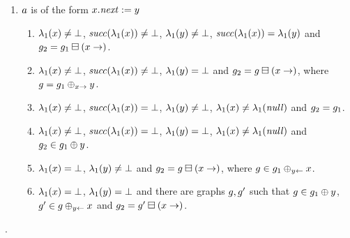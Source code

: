 {\begin{enumerate}
\begin{enumerate}
\begin{enumerate}
    $\labeling_1(\xvar)=\undef$, %
    $\labeling_1(\yvar)=\undef$ %
    there are graphs $\graph,\graph',\graph_3$ such that
    $\graph\equals\graph_1\addVar{\xvar}$, %
    $\graph'\in\graph\addVarAsPredOf{\xvar}{\yvar}$, %
    $\graph_3\equals\graph'\addEdgeBetween{\yvar}{\xvar}$ and %
    $\graph_2=\graph_3\delVar{\xvar}$.
    Observe that \xvar\ just serves here as a temporary variable.
  \end{enumerate}
\item $a$ is of the form $x.{\it next}:=y$
  \begin{enumerate}
  \item \label{pre:case:dotNextAssignedA}%
    $\lambda_1(x)\neq\bot$, %
    ${\it succ}(\lambda_1(x))\neq\bot$, %
    $\lambda_1(y)\neq\bot$, %
    ${\it succ}(\lambda_1(x))=\lambda_1(y)$ and
    $g_2=g_1\boxminus({x}\rightarrow)$.
  \item \label{pre:case:dotNextAssignedB}%
    $\lambda_1(x)\neq\bot$, %
    ${\it succ}(\lambda_1(x))\neq\bot$, %
    $\labeling_1(\yvar)=\undef$ and %
    $g_2=g\boxminus({x}\rightarrow)$, %
    where $g=g_1\oplus_{{x}\rightarrow}{y}$.
  \item \label{pre:case:dotNextAssignedC}%
    $\lambda_1(x)\neq\bot$, %
    ${\it succ}(\lambda_1(x))=\bot$, %
    $\lambda_1(y)\neq\bot$, %
    $\lambda_1(x)\neq\lambda_1({\it null})$ %
    and %
    $g_2=g_1$.
  \item \label{pre:case:dotNextAssignedD}%
    $\lambda_1(x)\neq\bot$, %
    ${\it succ}(\lambda_1(x))=\bot$, %
    $\labeling_1(\yvar)=\undef$, %
    $\lambda_1(x)\neq\lambda_1({\it null})$ and %
    $g_2\in g_1\oplus{\ensuremath{y}}$.
  \item \label{pre:case:dotNextAssignedE}%
    $\labeling_1(\xvar)=\undef$,%
    $\lambda_1(y)\neq\bot$ and %
    $g_2=g\boxminus({x}\rightarrow)$, where %
    $g\in g_1\oplus_{{y}\leftarrow}{x}$.
  \item \label{pre:case:dotNextAssignedF}%
    $\labeling_1(\xvar)=\undef$, %
    $\labeling_1(\yvar)=\undef$ and %
    there are graphs $g,g'$ such that
    $g\in g_1\oplus{\ensuremath{y}}$, %
    $g'\in g\oplus_{{y}\leftarrow}{x}$ and %
    $g_2=g'\boxminus({x}\rightarrow)$.
  \end{enumerate}
\end{enumerate}
%
\end{enumerate}.
}
